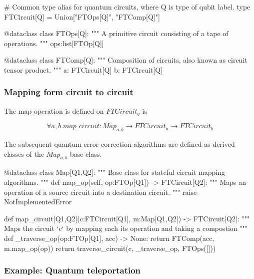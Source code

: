   \begin{python}
  # Common type alias for quantum circuits, where Q is type of qubit label.
  type FTCircuit[Q] = Union["FTOps[Q]", "FTComp[Q]"]

  @dataclass
  class FTOps[Q]:
    """ A primitive circuit consisting of a tape of operations. """
    ops:list[FTOp[Q]]

  @dataclass
  class FTComp[Q]:
    """ Composition of circuits, also known as circuit tensor product. """
    a: FTCircuit[Q]
    b: FTCircuit[Q]
  \end{python}


\subsubsection{Mapping form circuit to circuit}

The map operation is defined on $FTCircuit_q$ is

$$
\forall a,b . map\_circuit : Map_{a,b} \to FTCircuit_a \to FTCircuit_b
$$

The subsequent quantum error correction algorithms are defined as derived classes of the
$Map_{a,b}$ base class.

  \begin{python}
  @dataclass
  class Map[Q1,Q2]:
    """ Base class for stateful circuit mapping algorithms. """
    def map_op(self, op:FTOp[Q1]) -> FTCircuit[Q2]:
      """ Maps an operation of a source circuit into a destination circuit. """
      raise NotImplementedError


  def map_circuit[Q1,Q2](c:FTCircuit[Q1], m:Map[Q1,Q2]) -> FTCircuit[Q2]:
    """ Maps the circuit `c` by mapping each its operation and taking a compostion """
    def _traverse_op(op:FTOp[Q1], acc) -> None:
      return FTComp(acc, m.map_op(op))
    return traverse_circuit(c, _traverse_op, FTOps([]))
  \end{python}

\subsubsection{Example: Quantum teleportation}

